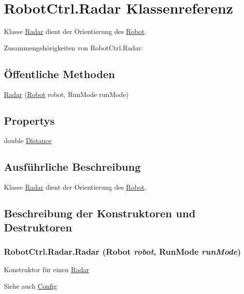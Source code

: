 \hypertarget{class_robot_ctrl_1_1_radar}{
\section{RobotCtrl.Radar Klassenreferenz}
\label{class_robot_ctrl_1_1_radar}
}


Klasse \hyperlink{class_robot_ctrl_1_1_radar}{Radar} dient der Orientierung des \hyperlink{class_robot_ctrl_1_1_robot}{Robot}.  




Zusammengehörigkeiten von RobotCtrl.Radar:\subsection*{Öffentliche Methoden}
\begin{DoxyCompactItemize}
\item 
\hyperlink{class_robot_ctrl_1_1_radar_aec75e7f4e126ac40c008c5d30d1c8dba}{Radar} (\hyperlink{class_robot_ctrl_1_1_robot}{Robot} robot, RunMode runMode)
\end{DoxyCompactItemize}
\subsection*{Propertys}
\begin{DoxyCompactItemize}
\item 
double \hyperlink{class_robot_ctrl_1_1_radar_a0339d462806cb7fc3759d850b5564dd9}{Distance}
\end{DoxyCompactItemize}


\subsection{Ausführliche Beschreibung}
Klasse \hyperlink{class_robot_ctrl_1_1_radar}{Radar} dient der Orientierung des \hyperlink{class_robot_ctrl_1_1_robot}{Robot}. 

\subsection{Beschreibung der Konstruktoren und Destruktoren}
\hypertarget{class_robot_ctrl_1_1_radar_aec75e7f4e126ac40c008c5d30d1c8dba}{
\subsubsection[{Radar}]{\setlength{\rightskip}{0pt plus 5cm}RobotCtrl.Radar.Radar ({\bf Robot} {\em robot}, \/  RunMode {\em runMode})}}
\label{class_robot_ctrl_1_1_radar_aec75e7f4e126ac40c008c5d30d1c8dba}
Konstruktor f\"{u}r einen \hyperlink{class_robot_ctrl_1_1_radar}{Radar} \begin{DoxySeeAlso}{Siehe auch}
\hyperlink{class_robot_ctrl_1_1_config}{Config}
\end{DoxySeeAlso}

